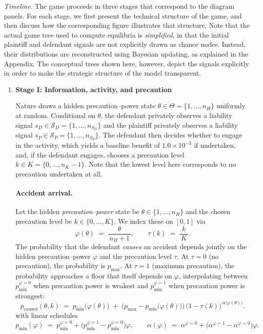 \documentclass{article}
\begin{document}
\emph{Timeline.} The game proceeds in three stages that correspond to the diagram panels. For each stage, we first present the technical structure of the game, and then discuss how the corresponding figure illustrates that structure. Note that the actual game tree used to compute equilibria is \emph{simplified}, in that the initial plaintiff and defendant signals are not explicitly drawn as chance nodes. Instead, their distributions are reconstructed using Bayesian updating, as explained in the Appendix. The conceptual trees shown here, however, depict the signals explicitly in order to make the strategic structure of the model transparent.

\begin{enumerate}
  \item \textbf{Stage I: Information, activity, and precaution}

Nature draws a hidden precaution--power state $\theta \in \Theta = \{1,\dots,n_H\}$ uniformly at random. Conditional on $\theta$, the defendant privately observes a liability signal $s_D \in \mathcal{S}_D = \{1,\dots,n_{S_D}\}$ and the plaintiff privately observes a liability signal $s_P \in \mathcal{S}_P = \{1,\dots,n_{S_P}\}$. The defendant then decides whether to engage in the activity, which yields a baseline benefit of $1.0 \times 10^{-3}$ if undertaken, and, if the defendant engages, chooses a precaution level $k \in K = \{0,\dots,n_K-1\}$. Note that the lowest level here corresponds to no precaution undertaken at all.

\paragraph{Accident arrival.}
Let the hidden \emph{precaution–power} state be $\theta\in\{1,\dots,n_H\}$ and the chosen precaution level be $k\in\{0,\dots,K\}$.  We index these on $[0,1]$ via
\[
\varphi(\theta) \;=\; \frac{\theta}{\,n_H+1\,}, 
\qquad
\tau(k) \;=\; \frac{k}{\,K\,}.
\]
The probability that the defendant \emph{causes} an accident depends jointly on the hidden precaution–power $\varphi$ and the precaution level $\tau$.  At $\tau=0$ (no precaution), the probability is $p_{\max}$.  At $\tau=1$ (maximum precaution), the probability approaches a floor that itself depends on $\varphi$, interpolating between $p_{\min}^{\varphi=0}$ when precaution power is weakest and $p_{\min}^{\varphi=1}$ when precaution power is strongest:
\begin{equation}
p_{\mathrm{caused}}(\theta,k)
\;=\;
p_{\min}\!\bigl(\varphi(\theta)\bigr)
\;+\;
\bigl(p_{\max}-p_{\min}\!\bigl(\varphi(\theta)\bigr)\bigr)\,
\bigl(1-\tau(k)\bigr)^{\,\alpha\!\bigl(\varphi(\theta)\bigr)}.
\label{eq:pcaused}
\end{equation}
with linear schedules
\[
p_{\min}(\varphi) \;=\; p_{\min}^{\varphi=0} + \bigl(p_{\min}^{\varphi=1}-p_{\min}^{\varphi=0}\bigr)\varphi,
\qquad
\alpha(\varphi) \;=\; \alpha^{\varphi=0} + \bigl(\alpha^{\varphi=1}-\alpha^{\varphi=0}\bigr)\varphi.
\]


\end{enumerate}
\end{document}
